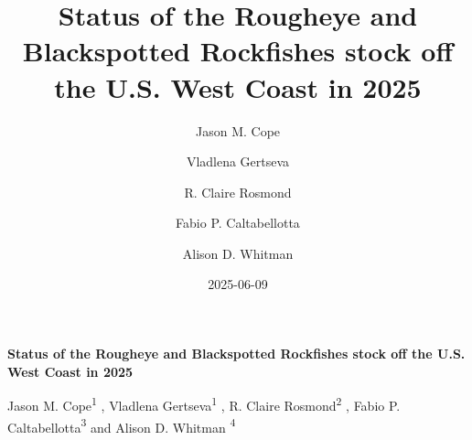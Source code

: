 \documentclass[
]{scrartcl}
\title{Status of the Rougheye and Blackspotted Rockfishes stock off the
U.S. West Coast in 2025}
\author{Jason M. Cope \and Vladlena Gertseva \and R. Claire
Rosmond \and Fabio P. Caltabellotta \and Alison D. Whitman}
\date{2025-06-09}
\begin{document}
  \begin{titlepage}

  \begin{minipage}[b][\textheight][s]{\textwidth}


  \raggedright




  {\huge\bfseries\nohyphens{Status of the Rougheye and Blackspotted
  Rockfishes stock off the U.S. West Coast in 2025}}\\[1\baselineskip]



  \vspace{1\baselineskip}


  \vspace{1\baselineskip}

   {\large{Jason M. Cope}}{\textsuperscript{1}}%
  ,
   {\large{Vladlena Gertseva}}{\textsuperscript{1}}%
  ,
   {\large{R. Claire Rosmond}}{\textsuperscript{2}}%
  ,
   {\large{Fabio P. Caltabellotta}}{\textsuperscript{3}}%
  { and \large{Alison D. Whitman}}%
  {\textsuperscript{4}}%



  \vspace{2\baselineskip}


\end{minipage}
\end{titlepage}
\end{document}
